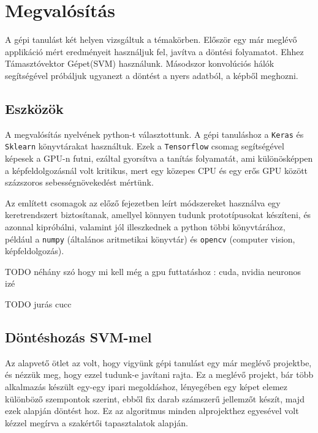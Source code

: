 
\newpage
\section{Megvalósítás}

A gépi tanulást két helyen vizsgáltuk a témakörben.
Először egy már meglévő applikáció mért eredményeit használjuk fel,
javítva a döntési folyamatot. Ehhez Támasztóvektor Gépet(SVM) használunk.
Másodszor konvolúciós hálók segítségével próbáljuk ugyanezt a döntést 
a nyers adatból, a képből meghozni. 

\subsection{Eszközök}

A megvalósítás nyelvének python-t választottunk.
A gépi tanuláshoz a \texttt{Keras} \cite{keras} és \texttt{Sklearn} \cite{sklearn} könyvtárakat 
használtuk. Ezek a \texttt{Tensorflow} \cite{tensorflow} csomag segítségével képesek a
GPU-n futni, ezáltal gyorsítva a tanítás folyamatát, ami különösképpen a 
képfeldolgozásnál volt kritikus, mert egy közepes CPU és egy erős GPU között
százszoros sebességnövekedést mértünk.

Az említett csomagok az előző fejezetben leírt módszereket használva egy
keretrendszert biztosítanak, amellyel könnyen tudunk prototípusokat készíteni,
és azonnal kipróbálni, valamint jól illeszkednek a python többi könyvtárához,
például a \texttt{numpy}\cite{numpy} (általános aritmetikai könyvtár) és \texttt{opencv} \cite{opencv}
(computer vision, képfeldolgozás).



TODO néhány szó hogy mi kell még a gpu futtatáshoz : cuda, nvidia neuronos izé


TODO jurás cucc



\subsection{Döntéshozás SVM-mel}

Az alapvető ötlet az volt, hogy vigyünk gépi tanulást egy már meglévő projektbe,
és nézzük meg, hogy ezzel tudunk-e javítani rajta. Ez a meglévő projekt, bár több 
alkalmazás készült egy-egy ipari megoldáshoz, lényegében egy képet elemez 
különböző szempontok szerint, ebből fix darab számszerű jellemzőt készít, 
majd ezek alapján döntést hoz. Ez az algoritmus minden alprojekthez egyesével
volt kézzel megírva a szakértői tapasztalatok alapján. 

